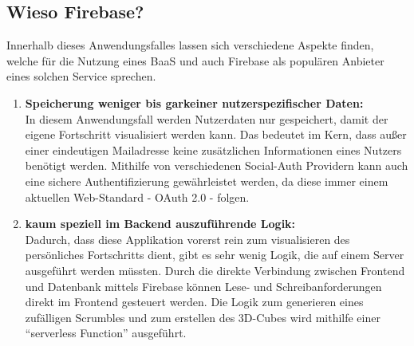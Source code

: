 \begin{definition}
    \subsection{Wieso Firebase?}
    Innerhalb dieses Anwendungsfalles lassen sich verschiedene Aspekte finden, welche für die Nutzung eines BaaS und auch Firebase als populären Anbieter eines solchen Service sprechen.
    \begin{enumerate}
        \item \textbf{Speicherung weniger bis garkeiner nutzerspezifischer Daten:}\\
        In diesem Anwendungsfall werden Nutzerdaten nur gespeichert, damit der eigene Fortschritt visualisiert werden kann. Das bedeutet im Kern, dass außer einer eindeutigen Mailadresse keine zusätzlichen Informationen eines Nutzers benötigt werden. Mithilfe von verschiedenen Social-Auth Providern kann auch eine sichere Authentifizierung gewährleistet werden, da diese immer einem aktuellen Web-Standard - OAuth 2.0 - folgen.
        \item \textbf{kaum speziell im Backend auszuführende Logik:}\\
        Dadurch, dass diese Applikation vorerst rein zum visualisieren des persönliches Fortschritts dient, gibt es sehr wenig Logik, die auf einem Server ausgeführt werden müssten. Durch die direkte Verbindung zwischen Frontend und Datenbank mittels Firebase können Lese- und Schreibanforderungen direkt im Frontend gesteuert werden. Die Logik zum generieren eines zufälligen Scrumbles und zum erstellen des 3D-Cubes wird mithilfe einer \enquote{serverless Function} ausgeführt.
    \end{enumerate}
\end{definition}
